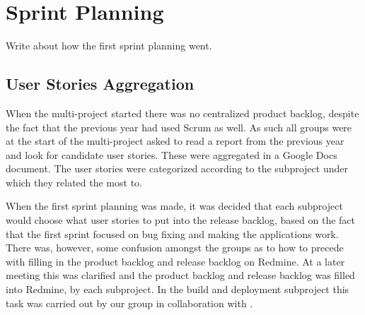 \chapter{Sprint Planning}
Write about how the first sprint planning went.

\section{User Stories Aggregation}
When the multi-project started there was no centralized product backlog, despite the fact that the previous year had used Scrum as well. As such all groups were at the start of the multi-project asked to read a report from the previous year and look for candidate user stories. These were aggregated in a Google Docs document. The user stories were categorized according to the subproject under which they related the most to.

When the first sprint planning was made, it was decided that each subproject would choose what user stories to put into the release backlog, based on the fact that the first sprint focused on bug fixing and making the applications work. There was, however, some confusion amongst the groups as to how to precede with filling in the product backlog and release backlog on Redmine. At a later meeting this was clarified and the product backlog and release backlog was filled into Redmine, by each subproject. In the build and deployment subproject this task was carried out by our group in collaboration with .
